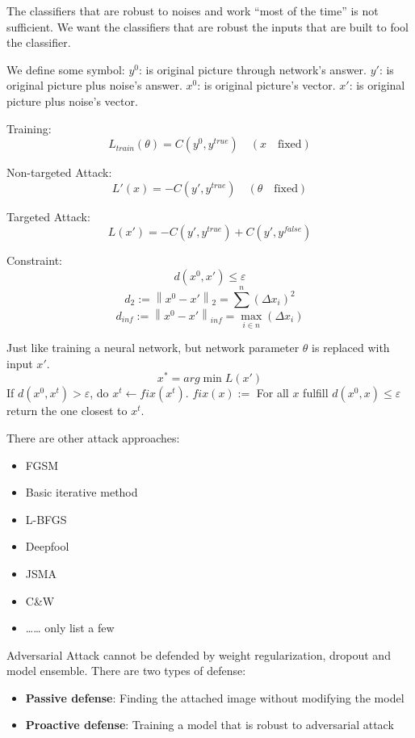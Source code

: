 \documentclass{article}
\newenvironment{propblock}[1][\textbf{Proposition}]{\begin{tcolorbox}
[title = \textbf{#1}, colback=Salmon!20, colframe=Salmon!90!Black]}{\end{tcolorbox}}
\begin{document}
The classifiers that are robust to noises and work “most of the time” is not sufficient. We want the classifiers that are robust the inputs that are built to fool the classifier.

We define some symbol: $y^0$: is original picture through network's answer. $y'$: is original picture plus noise's answer. $x^0$: is original picture's vector. $x'$: is original picture plus noise's vector.

Training: 
$$
L_{train}(\theta) = C(y^0,y^{true}) \quad (x\quad\text{fixed})
$$

Non-targeted Attack:
$$
L'(x) = - C(y',y^{true}) \quad (\theta\quad\text{fixed})
$$

Targeted Attack: 
$$
L(x') = -C(y',y^{true}) + C(y',y^{false})
$$

Constraint:
$$
d(x^0,x') \le \varepsilon
$$
$$
d_2 := \left\| x^0 - x'\right\|_2 = \sum^n (\Delta x_i)^2
$$
$$
d_{inf} := \left\| x^0 - x'\right\|_{inf} = \max_{i\in n}(\Delta x_i)
$$

\begin{propblock}[How to Train it]
    Just like training a neural network, but network parameter $\theta$ is replaced with input $x'$.
    $$
    x^* = arg \min L(x')
    $$
    If $d(x^0,x^t) > \varepsilon$, do $x^t\gets fix(x^t)$. $fix(x) :=$ For all $x$ fulfill $d(x^0,x) \le \varepsilon$ return the one closest to $x^t$.
\end{propblock}

There are other attack approaches:
\begin{itemize}
    \item FGSM
    \item Basic iterative method
    \item L-BFGS
    \item Deepfool
    \item JSMA
    \item C\&W 
    \item …… only list a few
\end{itemize}

Adversarial Attack cannot be defended by weight regularization, dropout and model ensemble. There are two types of defense:

\begin{itemize}
    \item \textbf{Passive defense}: Finding the attached image without modifying the model 
    \item \textbf{Proactive defense}: Training a model that is robust to adversarial attack
\end{itemize}
\end{document}
